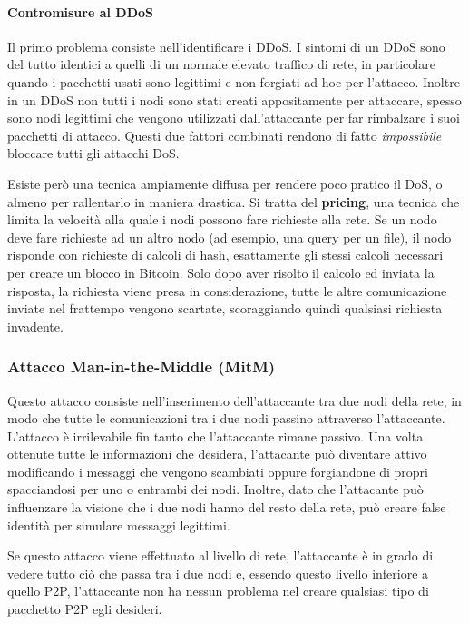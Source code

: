 \paragraph{Contromisure al DDoS}\label{contromisure-al-ddos}

Il primo problema consiste nell'identificare i DDoS. I sintomi di un
DDoS sono del tutto identici a quelli di un normale elevato traffico di
rete, in particolare quando i pacchetti usati sono legittimi e non
forgiati ad-hoc per l'attacco. Inoltre in un DDoS non tutti i nodi sono
stati creati appositamente per attaccare, spesso sono nodi legittimi che
vengono utilizzati dall'attaccante per far rimbalzare i suoi pacchetti
di attacco. Questi due fattori combinati rendono di fatto
\emph{impossibile} bloccare tutti gli attacchi DoS.

Esiste però una tecnica ampiamente diffusa per rendere poco pratico il
DoS, o almeno per rallentarlo in maniera drastica. Si tratta del
\textbf{pricing}, una tecnica che limita la velocità alla quale i nodi
possono fare richieste alla rete. Se un nodo deve fare richieste ad un
altro nodo (ad esempio, una query per un file), il nodo risponde con
richieste di calcoli di hash, esattamente gli stessi calcoli necessari
per creare un blocco in Bitcoin. Solo dopo aver risolto il calcolo ed
inviata la risposta, la richiesta viene presa in considerazione, tutte
le altre comunicazione inviate nel frattempo vengono scartate,
scoraggiando quindi qualsiasi richiesta invadente.

\subsubsection{Attacco Man-in-the-Middle
(MitM)}\label{attacco-man-in-the-middle-mitm}

Questo attacco consiste nell'inserimento dell'attaccante tra due nodi
della rete, in modo che tutte le comunicazioni tra i due nodi passino
attraverso l'attaccante. L'attacco è irrilevabile fin tanto che
l'attaccante rimane passivo. Una volta ottenute tutte le informazioni
che desidera, l'attacante può diventare attivo modificando i messaggi
che vengono scambiati oppure forgiandone di propri spacciandosi per uno
o entrambi dei nodi. Inoltre, dato che l'attacante può influenzare la
visione che i due nodi hanno del resto della rete, può creare false
identità per simulare messaggi legittimi.

Se questo attacco viene effettuato al livello di rete, l'attaccante è in
grado di vedere tutto ciò che passa tra i due nodi e, essendo questo
livello inferiore a quello P2P, l'attaccante non ha nessun problema nel
creare qualsiasi tipo di pacchetto P2P egli desideri.

